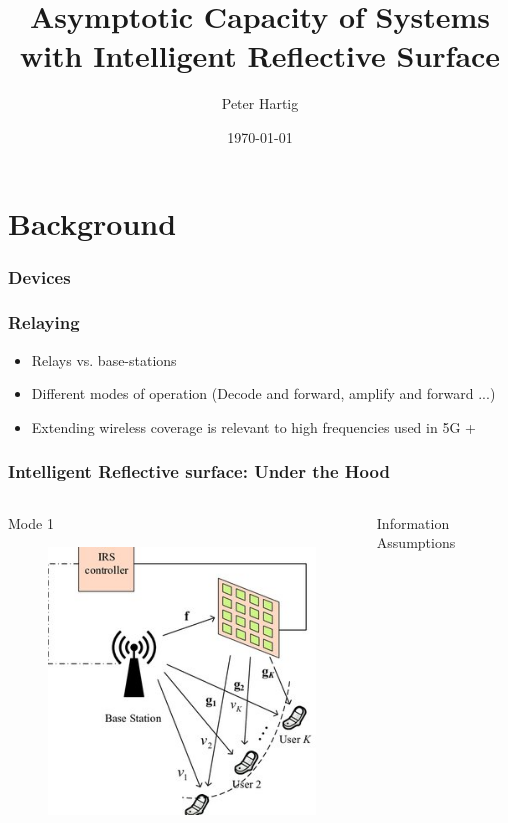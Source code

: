 \documentclass[10pt,tgadventor, onlymath]{beamer}
\title{\large \bfseries Asymptotic Capacity of Systems with Intelligent Reflective Surface}
\author{Peter Hartig\\[3ex]}
\date{\today}
\begin{document}
\frame{
\thispagestyle{empty}
\titlepage
}

\section{Background}
\subsubsection{Devices}
\begin{frame}
\frametitle{Relaying}

	\begin{itemize}
		\item 			
			Relays vs. base-stations
		\item 
			Different modes of operation (Decode and forward, amplify and forward ...)
		\item 
			Extending wireless coverage is relevant to high frequencies used in 5G +
	\end{itemize}
\end{frame}

\begin{frame}
\frametitle{Intelligent Reflective surface: Under the Hood}
\begin{columns}
\begin{column}{0.5\linewidth}
	Mode 1
	\begin{figure}
		\includegraphics[scale=1]{irs}
	\end{figure}\end{column}
\begin{column}{0.5\linewidth}
	Information Assumptions

\end{column}
\end{columns}
\end{frame}
\end{document}
